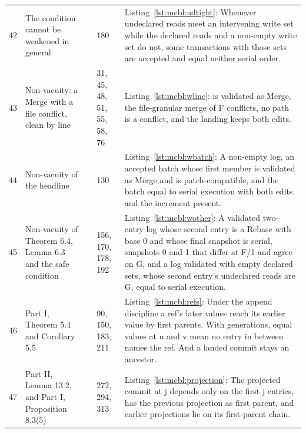 \documentclass[11pt,letterpaper]{article}
\theoremstyle{definition}
\theoremstyle{remark}
\begin{document}
\begin{small}
\begin{longtable}{@{}L{0.8cm}L{3.4cm}L{3.6cm}L{1.3cm}L{5.4cm}@{}}
42 & The condition cannot be weakened in general &  & 180 & Listing~\ref{lst:mcbl:udtight}: Whenever undeclared reads meet an intervening write set while the declared reads and a non-empty write set do not, some transactions with those sets are accepted and equal neither serial order. \\
43 & Non-vacuity: a Merge with a file conflict, clean by line &  & 31, 45, 48, 51, 55, 58, 76 & Listing~\ref{lst:mcbl:wline}:  is validated as Merge, the file-granular merge of F conflicts, no path is a conflict, and the landing keeps both edits. \\
44 & Non-vacuity of the headline &  & 130 & Listing~\ref{lst:mcbl:wbatch}: A non-empty log, an accepted batch whose first member is validated as Merge and is patch-compatible, and the batch equal to serial execution with both edits and the increment present. \\
45 & Non-vacuity of Theorem 6.4, Lemma 6.3 and the safe condition &  & 156, 170, 178, 192 & Listing~\ref{lst:mcbl:wother}: A validated two-entry log whose second entry is a Rebase with base 0 and whose final snapshot is serial, snapshots 0 and 1 that differ at F/1 and agree on G, and a log validated with empty declared sets, whose second entry's undeclared reads are G, equal to serial execution. \\
46 & Part I, Theorem 5.4 and Corollary 5.5 &  & 90, 150, 183, 211 & Listing~\ref{lst:mcbl:refs}: Under the append discipline a ref's later values reach its earlier value by first parents. With generations, equal values at u and v mean no entry in between names the ref. And a landed commit stays an ancestor. \\
47 & Part II, Lemma 13.2, and Part I, Proposition 8.3(5) &  & 272, 294, 313 & Listing~\ref{lst:mcbl:projection}: The projected commit at j depends only on the first j entries, has the previous projection as first parent, and earlier projections lie on its first-parent chain. \\
\end{longtable}
\end{small}
\end{document}
